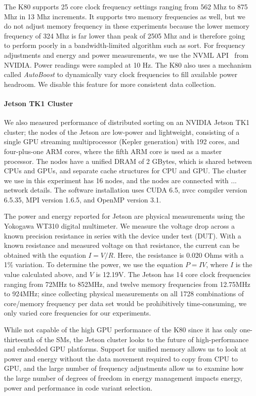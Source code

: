 The K80 supports 25 core clock frequency settings ranging from 562 Mhz to 875 Mhz
in 13 Mhz increments.
It supports two memory frequencies as well, 
but we do not adjust memory frequency in these experiments 
because the lower memory frequency of 324 Mhz
is far lower than peak of 2505 Mhz
and is therefore going to perform poorly in a bandwidth-limited
algorithm such as sort.
For frequency adjustments and energy and power measurements, we use the NVML
API~\cite{} from NVIDIA. Power readings were sampled at 10 Hz.
The K80 also uses a mechanism called \textit{AutoBoost} to dynamically
vary clock frequencies to fill available power headroom. We disable this feature
for more consistent data collection.

\paragraph{Jetson TK1 Cluster}
We also measured performance of distributed sorting on an NVIDIA 
Jetson TK1 cluster; the nodes of the Jetson are low-power and lightweight,
consisting of a single GPU streaming multiprocessor (Kepler generation)
with 192 cores, and 
four-plus-one ARM cores, where the fifth ARM core is used as a master processor.
The nodes have a unified DRAM of 2 GBytes, which is shared between CPUs and
GPUs, and separate cache structures for CPU and GPU.
The cluster we use in this experiment has 16 nodes, and
the nodes are connected with {\color{red} ... network details.}
The software installation uses CUDA 6.5, nvcc compiler version 6.5.35,
MPI version 1.6.5, and OpenMP version 3.1.

The power and energy reported for
Jetson are physical measurements  
using the Yokogawa WT310 digital multimeter.
We measure the voltage drop across a known precision resistance in series with the device under test (DUT).
With a known resistance and measured voltage on that resistance,
the current can be obtained with the equation $I=V/R$.
Here, the resistance is 0.020 Ohms with a 1\% variation.
To determine the power, we use the equation $P=IV$, where $I$ is the value calculated above, and $V$ is 12.19V.
The Jetson has 14 core clock frequencies ranging from 72MHz to 852MHz,
and twelve memory frequencies from 12.75MHz to 924MHz;
since collecting physical measurements 
on all 1728 combinations of core/memory frequency per data set would 
be prohibitively time-consuming, we only varied core frequencies for our experiments.

While not capable of the high GPU performance of the K80
since it has only one-thirteenth of the SMs,
the Jetson cluster looks to the future of high-performance and 
embedded GPU platforms. Support for unified memory allows us to look 
at power and energy without the data movement required to copy
from CPU to GPU, and the large number of frequency adjustments
allow us to examine how the large number of degrees of freedom
in energy management impacts energy, power and performance in 
code variant selection. 
